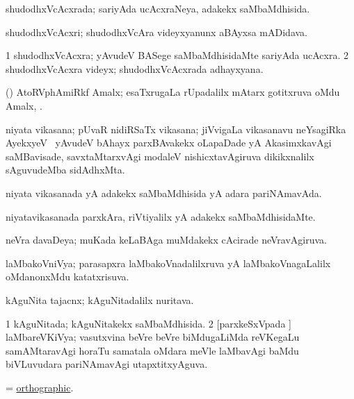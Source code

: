 \bentry
{}
\gl{\gu}
\bmng
shudodhxVcAcxrada; sariyAda ucAcxraNeya, adakekx saMbaMdhisida. 
\emng
\eentry

\bentry
{}
\gl{\nA}
\bmng
shudodhxVcAcxri; shudodhxVcAra videyxyanunx aBAyxsa mADidava. 
\emng
\eentry

\bentry
{}
\gl{\nA}
\bmng
\bnum
\num{1} shudodhxVcAcxra; yAvudeV BASege saMbaMdhisidaMte sariyAda ucAcxra. 
\num{2} shudodhxVcAcxra videyx; shudodhxVcAcxrada adhayxyana. 
\enum
\emng
\eentry

\bentry
{}
\gl{\nA}
\bmng
(\ravi) AtoRVphAmiRkf Amalx; esaTxrugaLa rUpadalilx mAtarx gotitxruva oMdu Amalx, . 
\emng
\eentry

\bentry
{}
\gl{\nA}
\bmng
niyata vikasana; pUvaR nidiRSaTx vikasana; jiVvigaLa vikasanavu neYsagiRka AyekxyeV \mo\ yAvudeV bAhayx parxBAvakekx oLapaDade yA AkasimxkavAgi saMBavisade, savxtaMtarxvAgi modaleV nishicxtavAgiruva dikikxnalilx sAguvudeMba sidAdhxMta. 
\emng
\eentry

\bentry
{}
\gl{\gu}
\bmng
niyata vikasanada yA adakekx saMbaMdhisida yA adara pariNAmavAda. 
\emng
\eentry

\bentry
{}
\gl{\kirxvi}
\bmng
niyatavikasanada parxkAra, riVtiyalilx yA adakekx saMbaMdhisidaMte. 
\emng
\eentry

\bentry
{}
\gl{\gu}
\bmng
neVra davaDeya; muKada keLaBAga muMdakekx cAcirade neVravAgiruva. 
\emng
\eentry

\bentry
{}
\gl{\gu}
\bmng
laMbakoVniVya; parasapxra laMbakoVnadalilxruva yA laMbakoVnagaLalilx oMdanonxMdu katatxrisuva. 
\emng
\eentry

\bentry
{}
\gl{\nA}
\bmng
kAguNita tajacnx; kAguNitadalilx nuritava. 
\emng
\eentry

\bentry
{}
\gl{\gu}
\bmng
\bnum
\num{1} kAguNitada; kAguNitakekx saMbaMdhisida. 
\num{2} [parxkeSxVpada  \vi] laMbareVKiVya; vasutxvina beVre beVre biMdugaLiMda reVKegaLu samAMtaravAgi horaTu samatala oMdara meVle laMbavAgi baMdu biVLuvudara pariNAmavAgi utapxtitxyAguva. 
\enum
\emng
\eentry

\bentry
{}
\gl{\gu}
\bmng
= \hyperlink{orthographic}{orthographic}. 
\emng
\eentry

